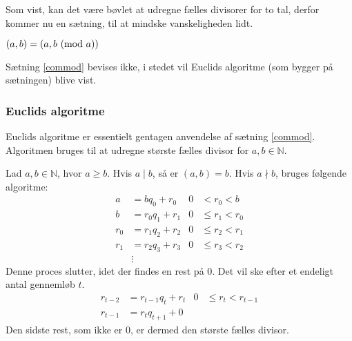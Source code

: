 Som vist, kan det være bøvlet at udregne fælles divisorer for to tal, derfor kommer nu en sætning, til at mindske vanskeligheden lidt.

\begin{sent}
    \label{commod}
    \((a, b) = (a, b \ (\mathrm{mod}\ a))\)
\end{sent}

Sætning \ref{commod} bevises ikke, i stedet vil Euclids algoritme (som bygger på sætningen) blive vist.



\subsubsection{Euclids algoritme}
Euclids algoritme er essentielt gentagen anvendelse af sætning \ref{commod}.
Algoritmen bruges til at udregne største fælles divisor for \(a, b \in \mathbb{N}\).
\begin{definition}
    Lad \(a, b \in \mathbb{N}\), hvor \(a \geq b\).
    Hvis \(a \mid b\), så er \((a, b) = b\).
    Hvis \(a \nmid b\), bruges følgende algoritme:
    \begin{align*}
        a   &= b q_0    + r_0   & 0 &<    r_0 < b\\
        b   &= r_0 q_1  + r_1   & 0 &\leq r_1 < r_0\\
        r_0 &= r_1 q_2  + r_2   & 0 &\leq r_2 < r_1\\
        r_1 &= r_2 q_3  + r_3   & 0 &\leq r_3 < r_2\\
        &\vdots
    \end{align*}
    Denne proces slutter, idet der findes en rest på 0.
    Det vil ske efter et endeligt antal gennemløb \(t\).
    \begin{align*}
        r_{t-2} &= r_{t-1}  q_t      + r_t   & 0 &\leq r_t < r_{t-1}\\
        r_{t-1} &= r_t      q_{t+1}  + 0
    \end{align*}
    Den sidste rest, som ikke er 0, er dermed den største fælles divisor.\cite[11]{absalg}
\end{definition}

